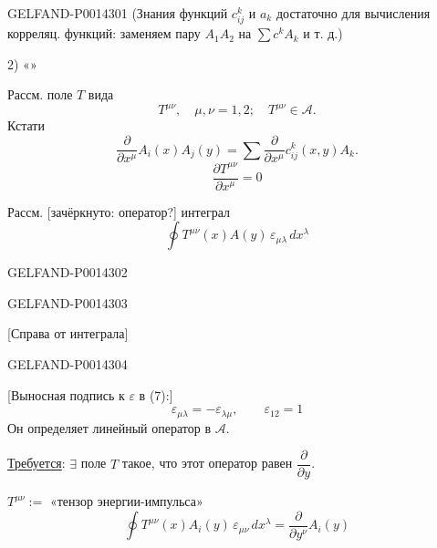 \begin{GelfandAdjacentEvidence}{GELFAND-P001430}{1}
(Знания функций \(c_{ij}^k\) и \(a_k\) достаточно для вычисления корреляц. функций:
заменяем пару \(A_1A_2\) на \(\sum c^kA_k\) и т. д.)

2) «»

Рассм. поле \(T\) вида
\[
T^{\mu\nu},\quad\mu,\nu=1,2;\quad T^{\mu\nu}\in\mathcal A.
\]
Кстати
\begin{equation*}
\tag{5}
\frac{\partial}{\partial x^\mu}A_i(x)A_j(y)
=\sum\frac{\partial}{\partial x^\mu}c_{ij}^k(x,y)A_k.
\end{equation*}
\begin{equation*}
\tag{6}
\frac{\partial T^{\mu\nu}}{\partial x^\mu}=0
\end{equation*}

Рассм. [зачёркнуто: оператор?] интеграл
\begin{equation*}
\tag{7}
\oint T^{\mu\nu}(x)A(y)\,\varepsilon_{\mu\lambda}\,dx^\lambda
\end{equation*}
\end{GelfandAdjacentEvidence}
\begin{GelfandAdjacentEvidence}{GELFAND-P001430}{2}

\end{GelfandAdjacentEvidence}
\begin{GelfandAdjacentEvidence}{GELFAND-P001430}{3}

[Справа от интеграла]
\end{GelfandAdjacentEvidence}
\begin{GelfandAdjacentEvidence}{GELFAND-P001430}{4}


[Выносная подпись к \(\varepsilon\) в (7):]
\[
\varepsilon_{\mu\lambda}=-\varepsilon_{\lambda\mu},\qquad\varepsilon_{12}=1
\]
Он определяет линейный оператор в \(\mathcal A\).

\uline{Требуется}: \(\exists\) поле \(T\) такое, что этот оператор равен \(\dfrac{\partial}{\partial y}\).

\(T^{\mu\nu}:=\) «тензор энергии-импульса»
\[
\oint T^{\mu\nu}(x)A_i(y)\,\varepsilon_{\mu\nu}\,dx^\lambda
=\frac{\partial}{\partial y^\nu}A_i(y)
\]
\end{GelfandAdjacentEvidence}


